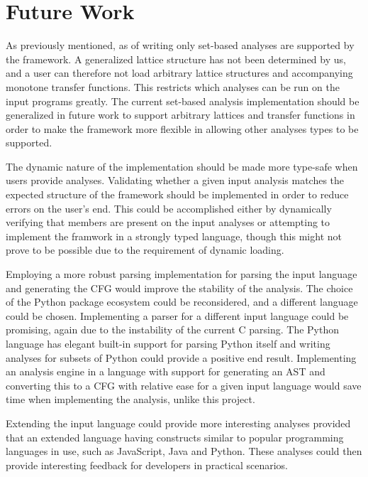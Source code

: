 \section{Future Work}
\label{futurework}

\newpar As previously mentioned, as of writing only set-based analyses are supported by the framework. A generalized lattice structure has not been determined by us, and a user can therefore not load arbitrary lattice structures and accompanying monotone transfer functions. This restricts which analyses can be run on the input programs greatly. The current set-based analysis implementation should be generalized in future work to support arbitrary lattices and transfer functions in order to make the framework more flexible in allowing other analyses types to be supported. 

\newpar The dynamic nature of the implementation should be made more type-safe when users provide analyses. Validating whether a given input analysis matches the expected structure of the framework should be implemented in order to reduce errors on the user's end. This could be accomplished either by dynamically verifying that members are present on the input analyses or attempting to implement the framwork in a strongly typed language, though this might not prove to be possible due to the requirement of dynamic loading.

\newpar Employing a more robust parsing implementation for parsing the input language and generating the CFG would improve the stability of the analysis. The choice of the Python package ecosystem could be reconsidered, and a different language could be chosen. Implementing a parser for a different input language could be promising, again due to the instability of the current C parsing. The Python language has elegant built-in support for parsing Python itself and writing analyses for subsets of Python could provide a positive end result. Implementing an analysis engine in a language with support for generating an AST and converting this to a CFG with relative ease for a given input language would save time when implementing the analysis, unlike this project.

\newpar Extending the input language could provide more interesting analyses provided that an extended language having constructs similar to popular programming languages in use, such as JavaScript, Java and Python\cite{github:languages}. These analyses could then provide interesting feedback for developers in practical scenarios.